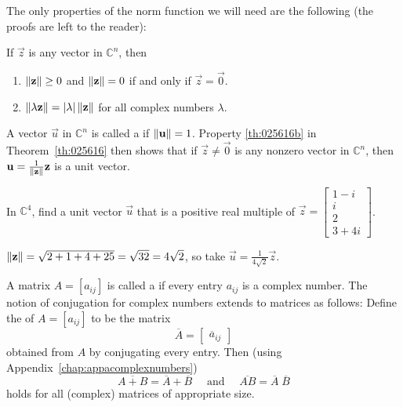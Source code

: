 \documentclass{ximera}
\begin{document}
The only properties of the norm function we will need are the following (the proofs are left to the reader):


\begin{theorem}\label{th:025616}
If $\vec{z}$ is any vector in $\mathbb{C}^n$, then


\begin{enumerate}
\item\label{th:025616a} $\left\lVert\mathbf{z}\right\rVert \ge 0$ and $\left\lVert\mathbf{z}\right\rVert = 0$ if and only if $\vec{z} = \vec{0}$.

\item\label{th:025616b} $\left\lVert\lambda\mathbf{z}\right\rVert = |\lambda| \left\lVert\mathbf{z}\right\rVert$ for all complex numbers $\lambda$.

\end{enumerate}
\end{theorem}

A vector $\vec{u}$ in $\mathbb{C}^n$ is called a  if $\left\lVert\mathbf{u}\right\rVert = 1$. Property \ref{th:025616b} in Theorem~\ref{th:025616} then shows that if $\vec{z} \neq \vec{0}$ is any nonzero vector in $\mathbb{C}^n$, then $\mathbf{u} = \frac{1}{\left\lVert\mathbf{z}\right\rVert}\mathbf{z}$ is a unit vector.


\begin{example}\label{ex:025631}
In $\mathbb{C}^4$, find a unit vector $\vec{u}$ that is a positive real multiple of $\vec{z} = \begin{bmatrix} 1 - i\\ i\\ 2\\ 3 + 4i \end{bmatrix}$.


\begin{explanation}
$\left\lVert\mathbf{z}\right\rVert = \sqrt{2+1+4+25} = \sqrt{32} = 4\sqrt{2}$, so take $\vec{u} = \frac{1}{4\sqrt{2}}\vec{z}$.
\end{explanation}
\end{example}

A matrix $A = \left[ a_{ij} \right]$ is called a  if every entry $a_{ij}$ is a complex number. The notion of conjugation for complex numbers extends to matrices as follows: Define the  of $A = \left[ a_{ij} \right]$ to be the matrix
\begin{equation*}
\overline{A} = \left[ \begin{array}{c} \overline{a}_{ij} \end{array}\right]
\end{equation*}
obtained from $A$ by conjugating every entry. Then (using Appendix~\ref{chap:appacomplexnumbers})
\begin{equation*}
\overline{A + B} = \overline{A} + \overline{B} \quad \mbox{ and } \quad \overline{AB} = \overline{A} \; \overline{B}
\end{equation*}
holds for all (complex) matrices of appropriate size.
\end{document}
